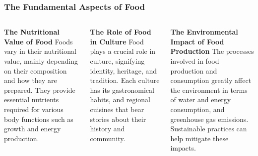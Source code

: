 \documentclass[5pt]{beamer}
\begin{document}
\begin{frame}
\frametitle{The Fundamental Aspects of Food}
\begin{columns}
\begin{column}{0.3\textwidth}
\begin{block}{\textbf{The Nutritional Value of Food}}
Foods vary in their nutritional value, mainly depending on their composition and how they are prepared. They provide essential nutrients required for various body functions such as growth and energy production.
\end{block}
\end{column}
\begin{column}{0.3\textwidth}
\begin{block}{\textbf{The Role of Food in Culture}}
Food plays a crucial role in culture, signifying identity, heritage, and tradition. Each culture has its gastronomical habits, and regional cuisines that bear stories about their history and community.
\end{block}
\end{column}
\begin{column}{0.3\textwidth}
\begin{block}{\textbf{The Environmental Impact of Food Production}}
The processes involved in food production and consumption greatly affect the environment in terms of water and energy consumption, and greenhouse gas emissions. Sustainable practices can help mitigate these impacts.
\end{block}
\end{column}
\end{columns}
\end{frame}
\end{document}
